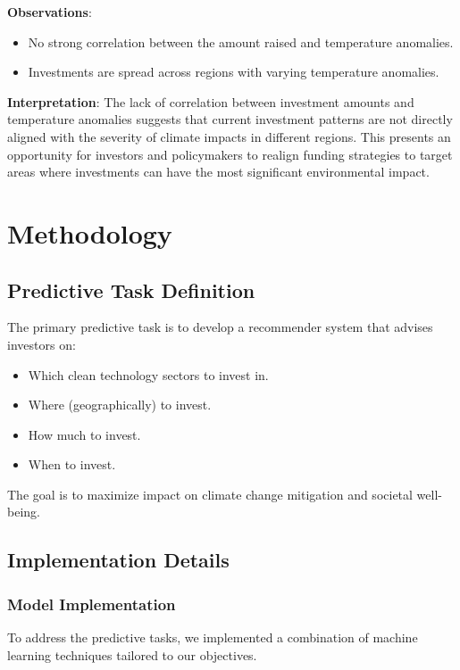 \documentclass[sigconf]{acmart}
\begin{document}
\textbf{Observations}:

\begin{itemize}
    \item No strong correlation between the amount raised and temperature anomalies.
    \item Investments are spread across regions with varying temperature anomalies.
\end{itemize}

\textbf{Interpretation}: The lack of correlation between investment amounts and temperature anomalies suggests that current investment patterns are not directly aligned with the severity of climate impacts in different regions. This presents an opportunity for investors and policymakers to realign funding strategies to target areas where investments can have the most significant environmental impact.

\section{Methodology}

\subsection{Predictive Task Definition}

The primary predictive task is to develop a recommender system that advises investors on:

\begin{itemize}
    \item Which clean technology sectors to invest in.
    \item Where (geographically) to invest.
    \item How much to invest.
    \item When to invest.
\end{itemize}

The goal is to maximize impact on climate change mitigation and societal well-being.

\subsection{Implementation Details}

\subsubsection{Model Implementation}

To address the predictive tasks, we implemented a combination of machine learning techniques tailored to our objectives.
\end{document}
